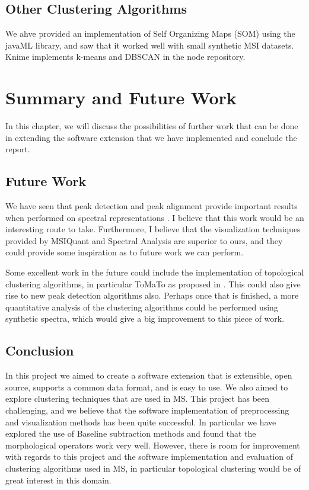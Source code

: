 \documentclass[11pt,openany]{book}
\begin{document}
\section{Other Clustering Algorithms}
We ahve provided an implementation of Self Organizing Maps (SOM) using the javaML library, and saw that it worked well with small synthetic MSI datasets. Knime implements k-means and DBSCAN in the node repository.

\chapter{Summary and Future Work}
In this chapter, we will discuss the possibilities of further work that can be done in extending the software extension that we have implemented and conclude the report.

\section{Future Work}
We have seen that peak detection and peak alignment provide important results when performed on spectral representations \cite{msi_data_spectral_representations}. I believe that this work would be an interesting route to take. Furthermore, I believe that the visualization techniques provided by MSIQuant and Spectral Analysis \cite{spectral_analysis_article} \cite{MSI_QUANT_Article} are superior to ours, and they could provide some inspiration as to future work we can perform.

Some excellent work in the future could include the implementation of topological clustering algorithms, in particular ToMaTo as proposed in \cite{chazal2013persistence}. This could also give rise to new peak detection algorithms also. Perhaps once that is finished, a more quantitative analysis of the clustering algorithms could be performed using synthetic spectra, which would give a big improvement to this piece of work.

\section{Conclusion}
In this project we aimed to create a software extension that is extensible, open source, supports a common data format, and is easy to use.  We also aimed to explore clustering techniques that are used in MS. This project has been challenging, and we believe that the software implementation of preprocessing and visualization methods has been quite successful. In particular we have explored the use of Baseline subtraction methods and found that the morphological operators work very well. However, there is room for improvement with regards to this project and the software implementation and evaluation of clustering algorithms used in MS, in particular topological clustering would be of great interest in this domain.
\end{document}
